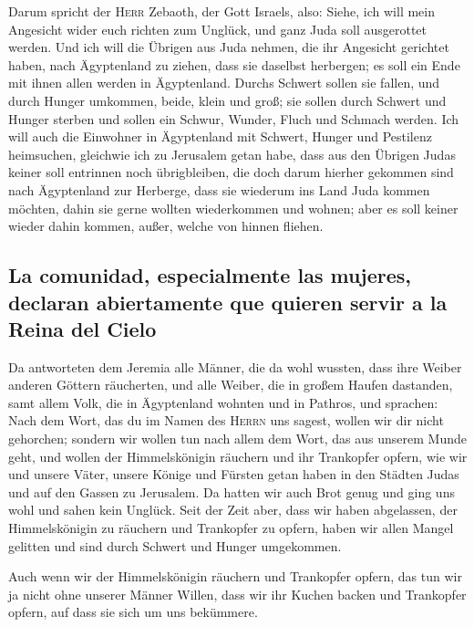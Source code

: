  Darum spricht der \textsc{Herr} Zebaoth, der Gott
Israels, also: Siehe, ich will mein Angesicht wider euch richten zum
Unglück, und ganz Juda soll ausgerottet werden.  Und ich
will die Übrigen aus Juda nehmen, die ihr Angesicht gerichtet haben,
nach Ägyptenland zu ziehen, dass sie daselbst herbergen; es soll ein
Ende mit ihnen allen werden in Ägyptenland. Durchs Schwert sollen sie
fallen, und durch Hunger umkommen, beide, klein und groß; sie sollen
durch Schwert und Hunger sterben und sollen ein Schwur, Wunder, Fluch
und Schmach werden.  Ich will auch die Einwohner in
Ägyptenland mit Schwert, Hunger und Pestilenz heimsuchen, gleichwie ich
zu Jerusalem getan habe,  dass aus den Übrigen Judas
keiner soll entrinnen noch übrigbleiben, die doch darum hierher gekommen
sind nach Ägyptenland zur Herberge, dass sie wiederum ins Land Juda
kommen möchten, dahin sie gerne wollten wiederkommen und wohnen; aber es
soll keiner wieder dahin kommen, außer, welche von hinnen fliehen.

\hypertarget{la-comunidad-especialmente-las-mujeres-declaran-abiertamente-que-quieren-servir-a-la-reina-del-cielo}{%
\subsection{La comunidad, especialmente las mujeres, declaran
abiertamente que quieren servir a la Reina del
Cielo}\label{la-comunidad-especialmente-las-mujeres-declaran-abiertamente-que-quieren-servir-a-la-reina-del-cielo}}

 Da antworteten dem Jeremia alle Männer, die da wohl
wussten, dass ihre Weiber anderen Göttern räucherten, und alle Weiber,
die in großem Haufen dastanden, samt allem Volk, die in Ägyptenland
wohnten und in Pathros, und sprachen:  Nach dem Wort, das
du im Namen des \textsc{Herrn} uns sagest, wollen wir dir nicht
gehorchen;  sondern wir wollen tun nach allem dem Wort,
das aus unserem Munde geht, und wollen der Himmelskönigin räuchern und
ihr Trankopfer opfern, wie wir und unsere Väter, unsere Könige und
Fürsten getan haben in den Städten Judas und auf den Gassen zu
Jerusalem. Da hatten wir auch Brot genug und ging uns wohl und sahen
kein Unglück.  Seit der Zeit aber, dass wir haben
abgelassen, der Himmelskönigin zu räuchern und Trankopfer zu opfern,
haben wir allen Mangel gelitten und sind durch Schwert und Hunger
umgekommen.

 Auch wenn wir der Himmelskönigin räuchern und Trankopfer
opfern, das tun wir ja nicht ohne unserer Männer Willen, dass wir ihr
Kuchen backen und Trankopfer opfern, auf dass sie sich um uns bekümmere.

